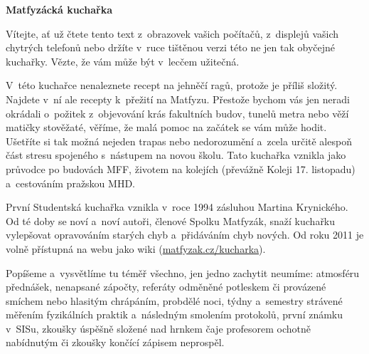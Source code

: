 \begin{center}
\huge{
	\textbf{Matfyzácká kuchařka        }
}

\vspace*{1cm}
\end{center}

\noindent Vítejte, ať už čtete tento text z~obrazovek vašich počítačů,
z~displejů vašich chytrých telefonů nebo držíte v~ruce tištěnou verzi této ne
jen tak obyčejné kuchařky. Vězte, že vám může být v~lecčem užitečná.


V~této kuchařce nenaleznete recept na jehněčí ragů, protože je příliš složitý.
Najdete v~ní ale recepty k~přežití na Matfyzu.
Přestože bychom vás jen neradi okrádali o~požitek z~objevování krás
fakultních budov, tunelů metra nebo věží matičky stověžaté, věříme,
že malá pomoc na začátek se vám může hodit.
Ušetříte si tak možná nejeden trapas nebo nedorozumění a~zcela určitě
alespoň část stresu spojeného s~nástupem na novou školu.
Tato kuchařka vznikla jako průvodce po budovách MFF,
životem na kolejích (převážně Koleji 17. listopadu) a~cestováním pražskou MHD.


První Studentská kuchařka vznikla v~roce 1994 zásluhou Martina Krynického.
Od té doby se noví a~noví autoři, členové Spolku Matfyzák,
snaží kuchařku vylepšovat opravováním starých chyb a~přidáváním chyb nových.
Od roku 2011 je volně přístupná na webu jako wiki
(\url{matfyzak.cz/kucharka}).


Popíšeme a~vysvětlíme tu téměř všechno, jen jedno zachytit neumíme:
atmosféru přednášek, nenapsané zápočty, referáty odměněné potleskem
či provázené smíchem nebo hlasitým chrápáním, probdělé noci,
týdny a~semestry strávené měřením fyzikálních praktik a~následným
smolením protokolů, první známku v~SISu, zkoušky úspěšně složené
nad hrnkem čaje profesorem ochotně nabídnutým či zkoušky končící
zápisem neprospěl.